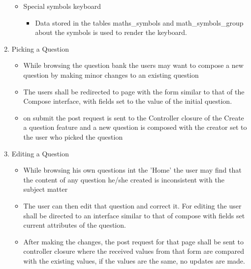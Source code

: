 \documentclass[a4paper,12pt,oneside]{book}
\begin{document}
\begin{enumerate}
\begin{itemize}
            \item Special symbols keyboard
                \begin{itemize}
                    \item Data stored in the tables maths\_symbols and math\_symbols\_group about the symbols is used to render the keyboard.
                \end{itemize}
            \end{itemize}
            
            
        \item Picking a Question 
            \begin{itemize}
              \item While browsing the question bank the users may want to compose a new question by making minor changes to an existing question
              
              \item The users shall be redirected to page with the form similar to that of the Compose interface, with fields set to the value of the initial question.
              
              \item on submit the post request is sent to the Controller closure of the Create a question feature and a new question is composed with the creator set to the user who picked the question
            \end{itemize}
            
        \item Editing a Question 
            \begin{itemize}
              \item While browsing his own questions int the 'Home' the user may find that the content of any question he/she created is inconsistent with the subject matter
              
              \item The user can then edit that question and correct it. For editing the user shall be directed to an interface similar to that of compose with fields set current attributes of the question.
              
              \item After making the changes, the post request for that page shall be sent to controller closure where the received values from that form are compared with the existing values, if the values are the same, no updates are made.
            \end{itemize}
            

\end{enumerate}
\end{document}
